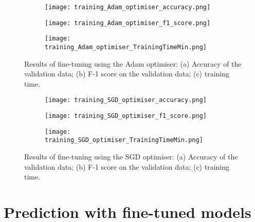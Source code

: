 \documentclass[a4paper,12pt]{article}
\newcommand{\figwidthh}{0.48\textwidth}
\begin{document}
\begin{figure}[p] 
	\begin{center}
		\begin{subfigure}[b]{\figwidthh}
			\caption{} 
			\texttt{[image: training\_Adam\_optimiser\_accuracy.png]}
		\end{subfigure}
        \hfill
		\begin{subfigure}[b]{\figwidthh}
			\caption{}
			\texttt{[image: training\_Adam\_optimiser\_f1\_score.png]}
		\end{subfigure}
        \hfill
		\begin{subfigure}[b]{\figwidthh}
			\caption{}
			\texttt{[image: training\_Adam\_optimiser\_TrainingTimeMin.png]}
		\end{subfigure}
	\end{center}
	\caption{Results of fine-tuning using the Adam optimiser: (a) Accuracy of the validation data; (b) F-1 score on the validation data; (c) training time. 
	} 
	\label{fig:res_training_adam}
\end{figure}


\begin{figure}[p] 
	\begin{center}
		\begin{subfigure}[b]{\figwidthh}
			\caption{} 
			\texttt{[image: training\_SGD\_optimiser\_accuracy.png]}
		\end{subfigure}
        \hfill
		\begin{subfigure}[b]{\figwidthh}
			\caption{}
			\texttt{[image: training\_SGD\_optimiser\_f1\_score.png]}
		\end{subfigure}
        \hfill
		\begin{subfigure}[b]{\figwidthh}
			\caption{}
			\texttt{[image: training\_SGD\_optimiser\_TrainingTimeMin.png]}
		\end{subfigure}
	\end{center}
	\caption{Results of fine-tuning using the SGD optimiser: (a) Accuracy of the validation data; (b) F-1 score on the validation data; (c) training time. 
	} 
	\label{fig:res_training_SGD}
\end{figure}

\newpage



\section{Prediction with fine-tuned models}
\end{document}
